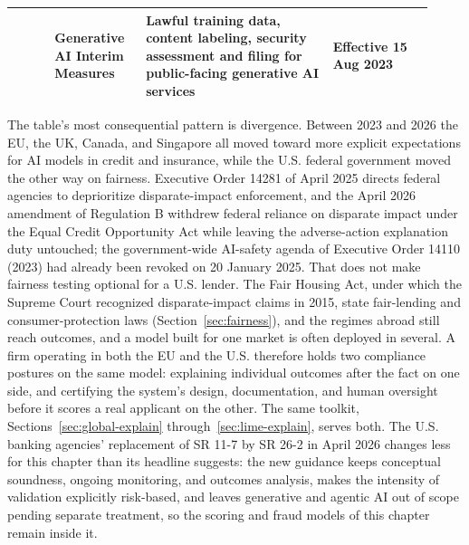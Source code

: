 \documentclass[../ai_in_finance]{subfiles}
\begin{document}
\begin{booktable}
\begin{tabular}{@{}>{\raggedright\arraybackslash}p{0.09\linewidth}>{\raggedright\arraybackslash}p{0.20\linewidth}>{\raggedright\arraybackslash}p{0.41\linewidth}>{\raggedright\arraybackslash}p{0.22\linewidth}@{}}
 & Generative AI Interim Measures & Lawful training data, content labeling, security assessment and filing for public-facing generative AI services & Effective 15 Aug 2023 \\
\bottomrule
\end{tabular}
\end{booktable}

The table's most consequential pattern is divergence. Between 2023 and 2026 the EU, the UK, Canada, and Singapore all moved toward more explicit expectations for AI models in credit and insurance, while the U.S. federal government moved the other way on fairness. Executive Order 14281 of April 2025 \parencite{eo2025disparate} directs federal agencies to deprioritize disparate-impact enforcement, and the April 2026 amendment of Regulation B \parencite{cfpb2026regb} withdrew federal reliance on disparate impact under the Equal Credit Opportunity Act while leaving the adverse-action explanation duty untouched; the government-wide AI-safety agenda of Executive Order 14110 (2023) had already been revoked on 20 January 2025. That does not make fairness testing optional for a U.S. lender. The Fair Housing Act, under which the Supreme Court recognized disparate-impact claims in 2015, state fair-lending and consumer-protection laws (Section~\ref{sec:fairness}), and the regimes abroad still reach outcomes, and a model built for one market is often deployed in several. A firm operating in both the EU and the U.S. therefore holds two compliance postures on the same model: explaining individual outcomes after the fact on one side, and certifying the system's design, documentation, and human oversight before it scores a real applicant on the other. The same toolkit, Sections~\ref{sec:global-explain} through~\ref{sec:lime-explain}, serves both. The U.S. banking agencies' replacement of SR 11-7 by SR 26-2 \parencite{frb2026revised} in April 2026 changes less for this chapter than its headline suggests: the new guidance keeps conceptual soundness, ongoing monitoring, and outcomes analysis, makes the intensity of validation explicitly risk-based, and leaves generative and agentic AI out of scope pending separate treatment, so the scoring and fraud models of this chapter remain inside it.
\end{document}
